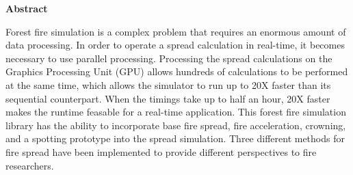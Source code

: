\newpage
{}
\begin{center}
  {\bf Abstract}
\end{center}

Forest fire simulation is a complex problem that requires an enormous amount of data processing. In order to operate a spread calculation in real-time, it becomes necessary to use parallel processing. Processing the spread calculations on the Graphics Processing Unit (GPU) allows hundreds of calculations to be performed at the same time, which allows the simulator to run up to 20X faster than its sequential counterpart. When the timings take up to half an hour, 20X faster makes the runtime feasable for a real-time application. This forest fire simulation library has the ability to incorporate base fire spread, fire acceleration, crowning, and a spotting prototype into the spread simulation. Three different methods for fire spread have been implemented to provide different perspectives to fire researchers. 